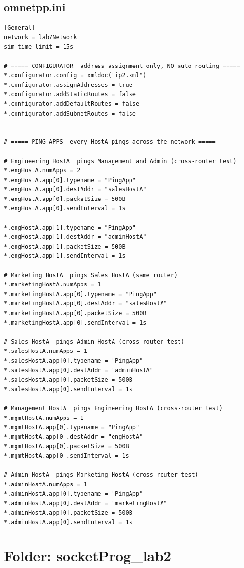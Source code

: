 \documentclass[11pt,a4paper]{article}
\begin{document}
\subsection*{omnetpp.ini}
\begin{lstlisting}[style=labcode]
[General]
network = lab7Network
sim-time-limit = 15s

# ===== CONFIGURATOR  address assignment only, NO auto routing =====
*.configurator.config = xmldoc("ip2.xml")
*.configurator.assignAddresses = true
*.configurator.addStaticRoutes = false
*.configurator.addDefaultRoutes = false
*.configurator.addSubnetRoutes = false


# ===== PING APPS  every HostA pings across the network =====

# Engineering HostA  pings Management and Admin (cross-router test)
*.engHostA.numApps = 2
*.engHostA.app[0].typename = "PingApp"
*.engHostA.app[0].destAddr = "salesHostA"
*.engHostA.app[0].packetSize = 500B
*.engHostA.app[0].sendInterval = 1s

*.engHostA.app[1].typename = "PingApp"
*.engHostA.app[1].destAddr = "adminHostA"
*.engHostA.app[1].packetSize = 500B
*.engHostA.app[1].sendInterval = 1s

# Marketing HostA  pings Sales HostA (same router)
*.marketingHostA.numApps = 1
*.marketingHostA.app[0].typename = "PingApp"
*.marketingHostA.app[0].destAddr = "salesHostA"
*.marketingHostA.app[0].packetSize = 500B
*.marketingHostA.app[0].sendInterval = 1s

# Sales HostA  pings Admin HostA (cross-router test)
*.salesHostA.numApps = 1
*.salesHostA.app[0].typename = "PingApp"
*.salesHostA.app[0].destAddr = "adminHostA"
*.salesHostA.app[0].packetSize = 500B
*.salesHostA.app[0].sendInterval = 1s

# Management HostA  pings Engineering HostA (cross-router test)
*.mgmtHostA.numApps = 1
*.mgmtHostA.app[0].typename = "PingApp"
*.mgmtHostA.app[0].destAddr = "engHostA"
*.mgmtHostA.app[0].packetSize = 500B
*.mgmtHostA.app[0].sendInterval = 1s

# Admin HostA  pings Marketing HostA (cross-router test)
*.adminHostA.numApps = 1
*.adminHostA.app[0].typename = "PingApp"
*.adminHostA.app[0].destAddr = "marketingHostA"
*.adminHostA.app[0].packetSize = 500B
*.adminHostA.app[0].sendInterval = 1s
\end{lstlisting}

\section{Folder: socketProg\_lab2}
\end{document}
